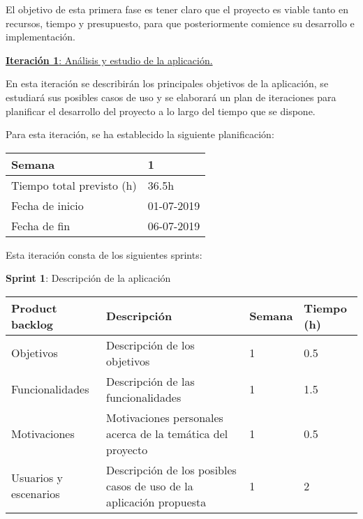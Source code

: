 El objetivo de esta primera fase es tener claro que el proyecto es viable tanto en recursos, tiempo y presupuesto, para que posteriormente comience su desarrollo e implementación.



\large{\underline{\textbf{Iteración 1}: Análisis y estudio de la aplicación.}}
\vspace{0.3cm}

\normalsize

En esta iteración se describirán los principales objetivos de la aplicación, se estudiará sus posibles casos de uso y se elaborará un plan de iteraciones para planificar el desarrollo del proyecto a lo largo del tiempo que se dispone.

Para esta iteración, se ha establecido la siguiente planificación:

\begin{table}[h!]
\centering
\begin{tabular}{|p{5cm}|p{4cm}|}
 \hline
	\cellcolor[gray]{0.9} Semana  & 1\\ \hline
	\cellcolor[gray]{0.9} Tiempo total previsto (h)  & 36.5h \\ \hline
	\cellcolor[gray]{0.9} Fecha de inicio  & 01-07-2019 \\ \hline
	\cellcolor[gray]{0.9} Fecha de fin  & 06-07-2019 \\ \hline
		
\end{tabular}
\end{table}

Esta iteración consta de los siguientes sprints:

\textbf{Sprint 1}: Descripción de la aplicación


\begin{table}[h!]
\begin{tabular}{|p{4cm}|p{7.2cm}|p{1.3cm}|p{2.1cm}|}
\hline
\rowcolor[HTML]{9B9B9B} 
{\color[HTML]{FFFFFF} Product backlog} & {\color[HTML]{FFFFFF} Descripción}                                  & {\color[HTML]{FFFFFF} Semana} & {\color[HTML]{FFFFFF}Tiempo (h)} \\ \hline
Objetivos                              & Descripción de los objetivos                                        & 1                             & 0.5                                    \\ \hline
Funcionalidades                        & Descripción de las funcionalidades                                  & 1                             & 1.5                                    \\ \hline
Motivaciones                           & Motivaciones personales acerca de la temática del proyecto          & 1                             & 0.5                                    \\ \hline
Usuarios y escenarios                  & Descripción de los posibles casos de uso de la aplicación propuesta & 1                             & 2                                      \\ \hline
\end{tabular}
\end{table}

